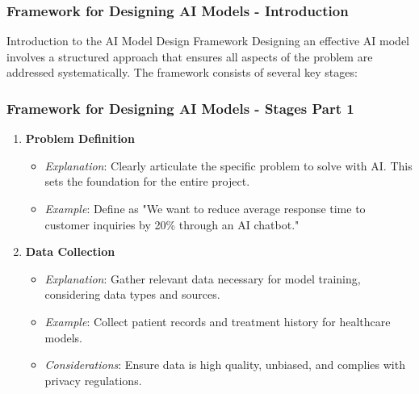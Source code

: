 \documentclass[aspectratio=169]{beamer}
\begin{document}
\begin{frame}[fragile]
    \frametitle{Framework for Designing AI Models - Introduction}
    \begin{block}{Introduction to the AI Model Design Framework}
        Designing an effective AI model involves a structured approach that ensures all aspects of the problem are addressed systematically. The framework consists of several key stages:
    \end{block}
\end{frame}

\begin{frame}[fragile]
    \frametitle{Framework for Designing AI Models - Stages Part 1}
    \begin{enumerate}
        \item \textbf{Problem Definition}
        \begin{itemize}
            \item \textit{Explanation}: Clearly articulate the specific problem to solve with AI. This sets the foundation for the entire project.
            \item \textit{Example}: Define as "We want to reduce average response time to customer inquiries by 20\% through an AI chatbot."
        \end{itemize}

        \item \textbf{Data Collection}
        \begin{itemize}
            \item \textit{Explanation}: Gather relevant data necessary for model training, considering data types and sources.
            \item \textit{Example}: Collect patient records and treatment history for healthcare models.
            \item \textit{Considerations}: Ensure data is high quality, unbiased, and complies with privacy regulations.
        \end{itemize}
    \end{enumerate}
\end{frame}
\end{document}
